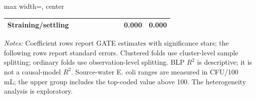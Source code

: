 \begin{landscape}
\begin{table}[p]
\begin{adjustbox}{max width=\linewidth, center}
\begin{tabular}{llcccccccc}
\quad Straining/settling &  &  &  &  &  &  &  & 0.000 & 0.000 \\
\bottomrule
\end{tabular}
\end{adjustbox}
\par\vspace{3pt}
\begin{minipage}{\linewidth}\footnotesize \textit{Notes:} Coefficient rows report GATE estimates with significance stars; the following rows report standard errors. Clustered folds use cluster-level sample splitting; ordinary folds use observation-level splitting. BLP $R^2$ is descriptive; it is not a causal-model $R^2$. Source-water E. coli ranges are measured in CFU/100 mL; the upper group includes the top-coded value above 100. The heterogeneity analysis is exploratory.\end{minipage}
\end{table}
\end{landscape}
